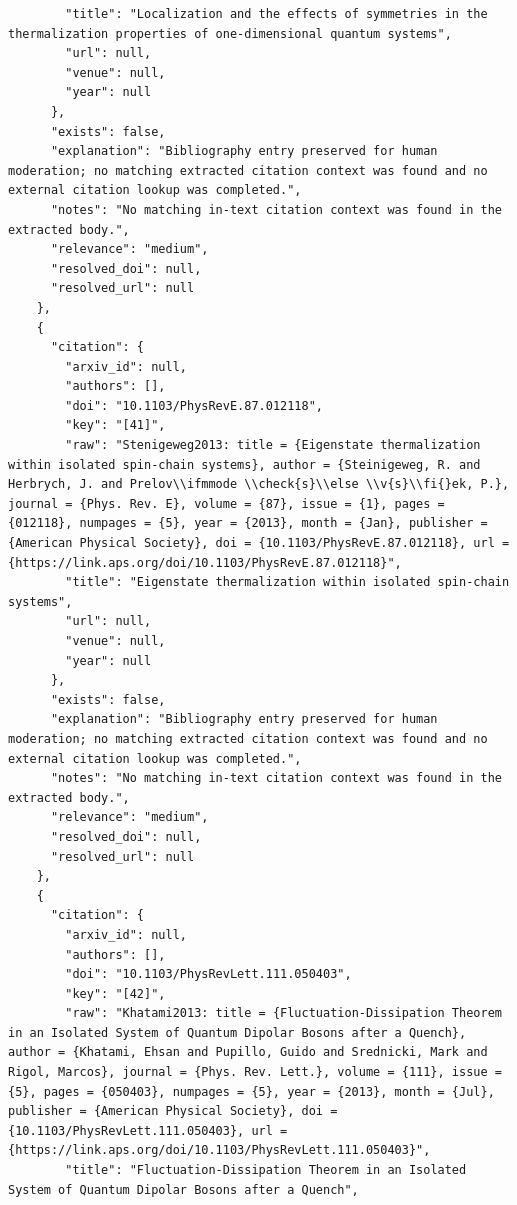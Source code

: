 \documentclass[11pt]{article}
\begin{document}
\begin{verbatim}
        "title": "Localization and the effects of symmetries in the thermalization properties of one-dimensional quantum systems",
        "url": null,
        "venue": null,
        "year": null
      },
      "exists": false,
      "explanation": "Bibliography entry preserved for human moderation; no matching extracted citation context was found and no external citation lookup was completed.",
      "notes": "No matching in-text citation context was found in the extracted body.",
      "relevance": "medium",
      "resolved_doi": null,
      "resolved_url": null
    },
    {
      "citation": {
        "arxiv_id": null,
        "authors": [],
        "doi": "10.1103/PhysRevE.87.012118",
        "key": "[41]",
        "raw": "Stenigeweg2013: title = {Eigenstate thermalization within isolated spin-chain systems}, author = {Steinigeweg, R. and Herbrych, J. and Prelov\\ifmmode \\check{s}\\else \\v{s}\\fi{}ek, P.}, journal = {Phys. Rev. E}, volume = {87}, issue = {1}, pages = {012118}, numpages = {5}, year = {2013}, month = {Jan}, publisher = {American Physical Society}, doi = {10.1103/PhysRevE.87.012118}, url = {https://link.aps.org/doi/10.1103/PhysRevE.87.012118}",
        "title": "Eigenstate thermalization within isolated spin-chain systems",
        "url": null,
        "venue": null,
        "year": null
      },
      "exists": false,
      "explanation": "Bibliography entry preserved for human moderation; no matching extracted citation context was found and no external citation lookup was completed.",
      "notes": "No matching in-text citation context was found in the extracted body.",
      "relevance": "medium",
      "resolved_doi": null,
      "resolved_url": null
    },
    {
      "citation": {
        "arxiv_id": null,
        "authors": [],
        "doi": "10.1103/PhysRevLett.111.050403",
        "key": "[42]",
        "raw": "Khatami2013: title = {Fluctuation-Dissipation Theorem in an Isolated System of Quantum Dipolar Bosons after a Quench}, author = {Khatami, Ehsan and Pupillo, Guido and Srednicki, Mark and Rigol, Marcos}, journal = {Phys. Rev. Lett.}, volume = {111}, issue = {5}, pages = {050403}, numpages = {5}, year = {2013}, month = {Jul}, publisher = {American Physical Society}, doi = {10.1103/PhysRevLett.111.050403}, url = {https://link.aps.org/doi/10.1103/PhysRevLett.111.050403}",
        "title": "Fluctuation-Dissipation Theorem in an Isolated System of Quantum Dipolar Bosons after a Quench",

\end{verbatim}
\end{document}
